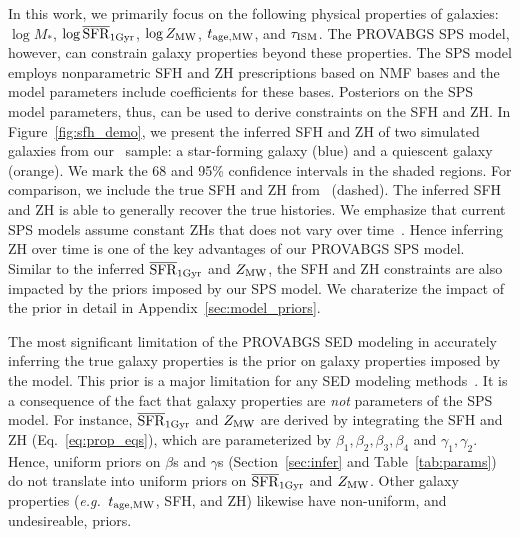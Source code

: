 In this work, we primarily focus on the following physical properties of
galaxies: $\log M_*$, $\log\overline{\rm SFR}_{\rm 1Gyr}$, $\log Z_{\rm MW}$, $t_{\rm age, MW}$, and $\tau_{\rm ISM}$. 
The {\sc PROVABGS} SPS model, however, can constrain galaxy properties beyond
these properties. 
The SPS model employs nonparametric SFH and ZH prescriptions based on NMF bases
and the model parameters include coefficients for these bases. 
Posteriors on the SPS model parameters, thus, can be used to derive constraints
on the SFH and ZH. 
In Figure~\ref{fig:sfh_demo}, we present the inferred SFH and ZH of two
simulated galaxies from our \lgal~sample: a star-forming galaxy (blue) and a
quiescent galaxy (orange). 
We mark the 68 and 95\% confidence intervals in the shaded regions. 
For comparison, we include the true SFH and ZH from \lgal~(dashed).  
The inferred SFH and ZH is able to generally recover the true histories. 
We emphasize that current SPS models assume constant ZHs that does not vary
over time~\citep{carnall2017, leja2019}. 
Hence inferring ZH over time is one of the key advantages of our {\sc PROVABGS}
SPS model. 
Similar to the inferred $\overline{\rm SFR}_{\rm 1Gyr}$ and $Z_{\rm MW}$, the SFH and ZH constraints are
also impacted by the priors imposed by our SPS model. 
We charaterize the impact of the prior in detail in
Appendix~\ref{sec:model_priors}.

The most significant limitation of the {\sc PROVABGS} SED modeling in
accurately inferring the true galaxy properties is the prior on galaxy
properties imposed by the model. 
This prior is a major limitation for any SED modeling
methods~\citep{carnall2017, leja2019}. 
It is a consequence of the fact that galaxy properties are \emph{not}
parameters of the SPS model.
For instance, $\overline{\rm SFR}_{\rm 1Gyr}$ and $Z_{\rm MW}$ are derived by integrating the SFH and ZH
(Eq.~\ref{eq:prop_eqs}), which are parameterized by $\beta_1, \beta_2, \beta_3,
\beta_4$ and $\gamma_1, \gamma_2$. 
Hence, uniform priors on $\beta$s and $\gamma$s (Section~\ref{sec:infer} and
Table~\ref{tab:params}) do not translate into uniform priors on $\overline{\rm SFR}_{\rm 1Gyr}$ and
$Z_{\rm MW}$.
Other galaxy properties (\emph{e.g.}~$t_{\rm age, MW}$, SFH, and ZH) likewise have
non-uniform, and undesireable, priors. 

